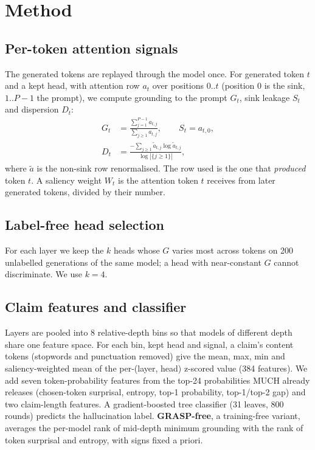 \documentclass[11pt]{article}
\begin{document}
\section{Method}
\subsection{Per-token attention signals}
The generated tokens are replayed through the model once. For generated token $t$ and a kept head,
with attention row $a_t$ over positions $0..t$ (position 0 is the sink, $1..P{-}1$ the prompt),
we compute grounding to the prompt $G_t$, sink leakage $S_t$ and dispersion $D_t$:
\begin{align}
G_t &= \frac{\sum_{j=1}^{P-1} a_{t,j}}{\sum_{j\ge 1} a_{t,j}}, \qquad S_t = a_{t,0},\\
D_t &= \frac{-\sum_{j\ge1} \tilde a_{t,j}\log \tilde a_{t,j}}{\log |\{j\ge1\}|},
\end{align}
where $\tilde a$ is the non-sink row renormalised. The row used is the one that \emph{produced}
token $t$. A saliency weight $W_t$ is the attention token $t$ receives from later generated tokens,
divided by their number.

\subsection{Label-free head selection}
For each layer we keep the $k$ heads whose $G$ varies most across tokens on 200 unlabelled
generations of the same model; a head with near-constant $G$ cannot discriminate. We use $k{=}4$.

\subsection{Claim features and classifier}
Layers are pooled into 8 relative-depth bins so that models of different depth share one feature
space. For each bin, kept head and signal, a claim's content tokens (stopwords and punctuation
removed) give the mean, max, min and saliency-weighted mean of the per-(layer, head) z-scored value
(384 features). We add seven token-probability features from the top-24 probabilities MUCH
already releases (chosen-token surprisal, entropy, top-1 probability, top-1/top-2 gap) and two
claim-length features. A gradient-boosted tree classifier (31 leaves, 800 rounds) predicts the
hallucination label. \textbf{GRASP-free}, a training-free variant, averages the per-model rank of
mid-depth minimum grounding with the rank of token surprisal and entropy, with signs fixed a priori.
\end{document}
